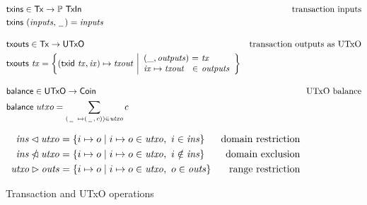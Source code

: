 \documentclass[11pt,a4paper]{article}
\begin{document}
\begin{figure}

\begin{align*}
& \fun{txins} \in \type{Tx} \to \powerset{\type{TxIn}}
& \text{transaction inputs} \\
& \fun{txins} ~ (\var{inputs}, \,\underline{\phantom{a}}\,) = \var{inputs}
\\[1em]
& \fun{txouts} \in \type{Tx} \to \type{UTxO}
& \text{transaction outputs as UTxO} \\
& \fun{txouts} ~ \var{tx} =
  \left\{ (\fun{txid} ~ \var{tx}, \var{ix}) \mapsto \var{txout} ~
  \middle| \begin{array}{l@{~}c@{~}l}
             (\_, \var{outputs}) & = & \var{tx} \\
             \var{ix} \mapsto \var{txout} & \in & \var{outputs}
           \end{array}
  \right\}
\\[1em]
& \fun{balance} \in \type{UTxO} \to \type{Coin}
& \text{UTxO balance} \\
& \fun{balance} ~ utxo = \sum_{(\,\underline{\phantom{a}}\, ~ \mapsto (\,\underline{\phantom{a}}\,, \,c)) \in \var{utxo}} c
\end{align*}

\begin{align*}
  \mathit{ins} \lhd \mathit{utxo}
& = \{ i \mapsto o \mid i \mapsto o \in \mathit{utxo}, ~ i \in \mathit{ins} \}
& \text{domain restriction}
\\
  \mathit{ins} \mathbin{\slashed{\lhd}} \mathit{utxo}
& = \{ i \mapsto o \mid i \mapsto o \in \mathit{utxo}, ~ i \notin \mathit{ins} \}
& \text{domain exclusion}
\\
  \mathit{utxo} \rhd \mathit{outs}
& = \{ i \mapsto o \mid i \mapsto o \in \mathit{utxo}, ~ o \in \mathit{outs} \}
& \text{range restriction}
\end{align*}

\caption{Transaction and UTxO operations}
\label{fig:auxiliary_ops}
\end{figure}
\end{document}
